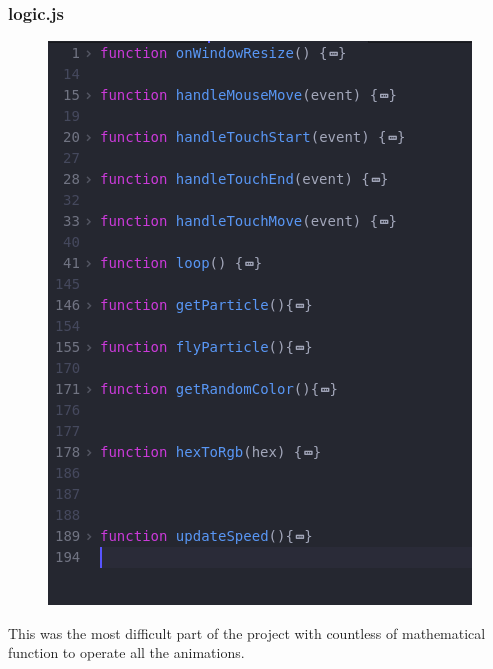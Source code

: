 \documentclass[a4paper,10pt]{article}
\begin{document}
\subsubsection{logic.js}
\begin{figure}[H]
  \includegraphics[width=\linewidth]{Screenshot_20190226_192414.png}
\end{figure}
This was the most difficult part of the project with countless of mathematical function to operate all the animations.
\end{document}
